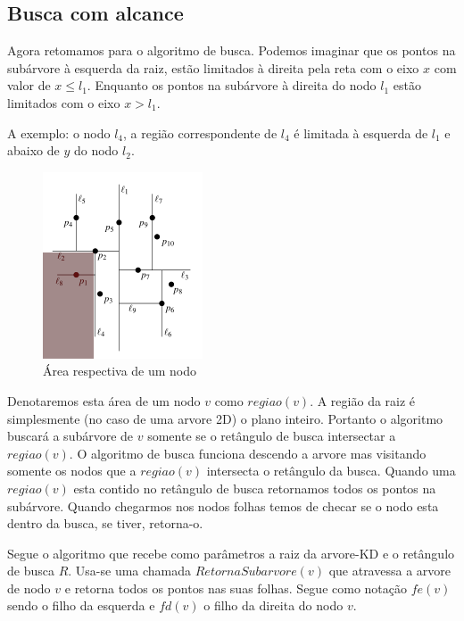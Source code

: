 
\subsection{Busca com alcance}

Agora retomamos para o algoritmo de busca. Podemos imaginar que os pontos na subárvore à esquerda
da raiz, estão limitados à direita pela reta com o eixo \(x\) com valor de \(x \leq l_1\).
Enquanto os pontos na subárvore à direita do nodo \(l_1\) estão limitados com o eixo \(x > l_1\).

A exemplo: o nodo \(l_4\), a região correspondente de \(l_4\) é limitada à esquerda de
\(l_1\) e abaixo de \(y\) do nodo \(l_2\).

\begin{figure}[htb]
    \caption{\label{fig:Fig_4} Área respectiva de um nodo}
    \begin{center}
        \includegraphics{images/kd_tree2.png}
    \end{center}
\end{figure}

Denotaremos esta área de um nodo \(v\) como \(regiao(v)\). A região da raiz é simplesmente
(no caso de uma arvore 2D) o plano inteiro.
Portanto o algoritmo buscará a subárvore de \(v\) somente se o retângulo de busca intersectar
a \(regiao(v)\).
O algoritmo de busca funciona descendo a arvore mas visitando somente os nodos que a
\(regiao(v)\) intersecta o retângulo da busca. Quando uma \(regiao(v)\) esta contido no
retângulo de busca retornamos todos os pontos na subárvore.
Quando chegarmos nos nodos folhas temos de checar se o nodo esta dentro da busca, se tiver,
retorna-o.

Segue o algoritmo que recebe como parâmetros a raiz da arvore-KD e o retângulo de busca \(R\).
Usa-se uma chamada \(RetornaSubarvore(v)\) que atravessa a arvore de nodo \(v\) e retorna
todos os pontos nas suas folhas. Segue como notação \(fe(v)\) sendo o filho da esquerda e
\(fd(v)\) o filho da direita do nodo \(v\).


